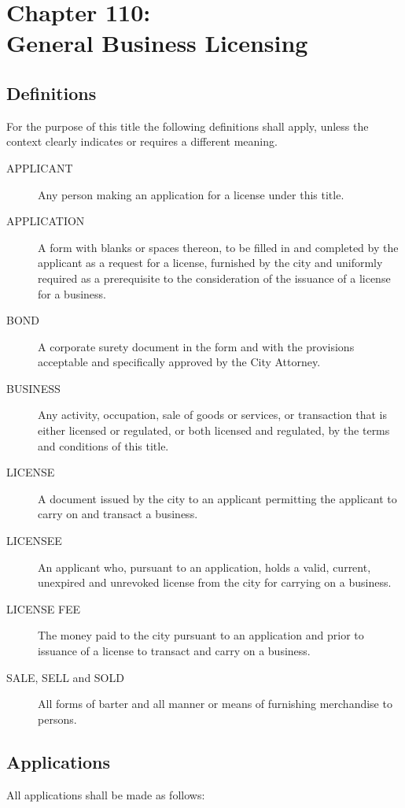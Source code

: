 \chapter*{Chapter 110: \\
	General Business Licensing}
    \vfill
    \minitoc
    \pagebreak

\section{Definitions}
For the purpose of this title the following definitions shall apply, unless the context clearly indicates or requires a different meaning.
\begin{description}
    \item[APPLICANT]  Any person making an application for a license under this title.
    \item[APPLICATION]  A form with blanks or spaces thereon, to be filled in and completed by the applicant as a request for a license, furnished by the city and uniformly required as a prerequisite to the consideration of the issuance of a license for a business.
    \item[BOND]  A corporate surety document in the form and with the provisions acceptable and specifically approved by the City Attorney.
    \item[BUSINESS]  Any activity, occupation, sale of goods or services, or transaction that is either licensed or regulated, or both licensed and regulated, by the terms and conditions of this title.
    \item[LICENSE]  A document issued by the city to an applicant permitting the applicant to carry on and transact a business.
    \item[LICENSEE]  An applicant who, pursuant to an application, holds a valid, current, unexpired and unrevoked license from the city for carrying on a business.
    \item[LICENSE FEE]  The money paid to the city pursuant to an application and prior to issuance of a license to transact and carry on a business.
    \item[SALE, SELL and SOLD]  All forms of barter and all manner or means of furnishing merchandise to persons.
\end{description}

\section{Applications}
All applications shall be made as follows:
